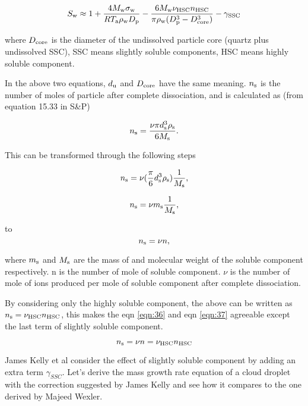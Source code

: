 \documentclass[12pt]{article}
\begin{document}
\begin{equation}\label{eqn:37}
S_{\rm w}\approx 1+\frac{4M_{\rm w}\sigma_{\rm w}}{RT_{\rm a}\rho_{\rm w}D_{\rm p}}-\frac{6M_{\rm w}\nu_{\rm HSC}n_{\rm HSC}}{\pi \rho_{\rm w}(D_{\rm p}^{3}-D_{\rm core}^{3})}-\gamma_{\rm SSC}
\end{equation}

where $D_{\rm core}$ is the diameter of the undissolved particle core (quartz plus undissolved SSC), SSC means slightly soluble components, HSC means highly soluble component.

In the above two equations, $d_{\rm u}$ and $D_{\rm core}$ have the same meaning.  $n_{\rm s}$ is the number of moles of particle after complete dissociation, and is calculated as (from equation 15.33 in S\&P) 

\begin{equation}\label{eqn:38}
n_{\rm s}=\frac{\nu \pi d_{\rm s}^{3} \rho_{\rm s}}{6 M_{\rm s}}.
\end{equation}

This can be transformed through the following steps

\begin{equation}\label{eqn:39}
n_{\rm s}=\nu (\frac{\pi}{6}d_{\rm s}^{3} \rho_{\rm s} ) \frac{1}{M_{\rm s}},
\end{equation}


\begin{equation}\label{eqn:40}
n_{\rm s}=\nu m_{\rm s}  \frac{1}{M_{\rm s}},
\end{equation}

to 
\begin{equation}\label{eqn:41}
n_{\rm s}=\nu n,
\end{equation}

where $m_{\rm s}$ and $M_{\rm s}$ are the mass of and molecular weight of the soluble component respectively. n is the number of mole of soluble component. $\nu$ is the number of mole of ions produced per mole of soluble component after complete dissociation.

By considering only the highly soluble component, the above can be written as $n_{\rm s}=\nu_{\rm HSC} n_{\rm HSC}$, this makes the eqn \ref{eqn:36} and eqn \ref{eqn:37} agreeable except the last term of slightly soluble component. 

\begin{equation}\label{eqn:42}
n_{\rm s}=\nu n=\nu_{\rm HSC} n_{\rm HSC}
\end{equation}

James Kelly et al consider the effect of slightly soluble component by adding an extra term $\gamma_{SSC}$.  Let's derive the mass growth rate equation of a cloud droplet with the correction suggested by James Kelly and see how it compares to the one derived by Majeed Wexler.
\end{document}
